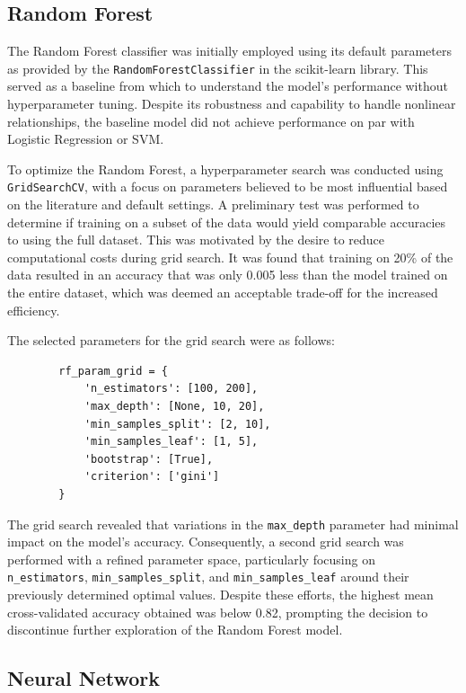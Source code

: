 \documentclass[conference]{IEEEtran}
\begin{document}
	\subsection{Random Forest}
	
	The Random Forest classifier was initially employed using its default parameters as provided by the \texttt{RandomForestClassifier} in the scikit-learn library. This served as a baseline from which to understand the model's performance without hyperparameter tuning. Despite its robustness and capability to handle nonlinear relationships, the baseline model did not achieve performance on par with Logistic Regression or SVM.
	
	To optimize the Random Forest, a hyperparameter search was conducted using \texttt{GridSearchCV}, with a focus on parameters believed to be most influential based on the literature and default settings. A preliminary test was performed to determine if training on a subset of the data would yield comparable accuracies to using the full dataset. This was motivated by the desire to reduce computational costs during grid search. It was found that training on 20\% of the data resulted in an accuracy that was only 0.005 less than the model trained on the entire dataset, which was deemed an acceptable trade-off for the increased efficiency.
	
	The selected parameters for the grid search were as follows:
	
	\begin{verbatim}
		rf_param_grid = {
			'n_estimators': [100, 200],
			'max_depth': [None, 10, 20],
			'min_samples_split': [2, 10],
			'min_samples_leaf': [1, 5],
			'bootstrap': [True],
			'criterion': ['gini']
		}
	\end{verbatim}
	
	The grid search revealed that variations in the \texttt{max\_depth} parameter had minimal impact on the model's accuracy. Consequently, a second grid search was performed with a refined parameter space, particularly focusing on \texttt{n\_estimators}, \texttt{min\_samples\_split}, and \texttt{min\_samples\_leaf} around their previously determined optimal values. Despite these efforts, the highest mean cross-validated accuracy obtained was below 0.82, prompting the decision to discontinue further exploration of the Random Forest model.
	
	\subsection{Neural Network}
	
\end{document}
